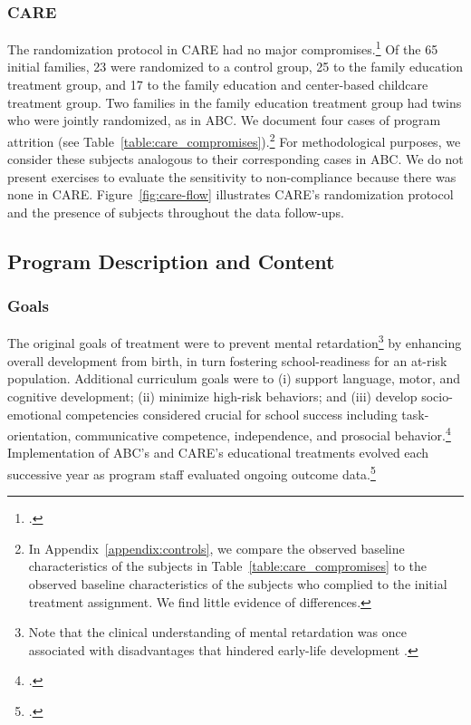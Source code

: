 \begin{appendices}
\subsubsection{CARE}

\noindent The randomization protocol in CARE had no major compromises.\footnote{\citet{Wasik_Ramey_etal_1990_CD,Burchinal_Campbell_etal_1997_CD}.} Of the 65 initial families, 23 were randomized to a control group, 25 to the family education treatment group, and 17 to the family education and center-based childcare treatment group. Two families in the family education treatment group had twins who were jointly randomized, as in ABC. We document four cases of program attrition (see Table~\ref{table:care_compromises}).\footnote{In Appendix~\ref{appendix:controls}, we compare the observed baseline characteristics of the subjects in Table~\ref{table:care_compromises} to the observed baseline characteristics of the subjects who complied to the initial treatment assignment. We find little evidence of differences.} For methodological purposes, we consider these subjects analogous to their corresponding cases in ABC. We do not present exercises to evaluate the sensitivity to non-compliance because there was none in CARE. Figure~\ref{fig:care-flow} illustrates CARE's randomization protocol and the presence of subjects throughout the data follow-ups.\\




\subsection{Program Description and Content}

\subsubsection{Goals}
\noindent The original goals of treatment were to prevent mental retardation\footnote{Note that the clinical understanding of mental retardation was once associated with disadvantages that hindered early-life development \citep{Mental-Retardation_America_2004_BOOK_NYU}.} by enhancing overall development from birth, in turn fostering school-readiness for an at-risk population. Additional curriculum goals were to (i) support language, motor, and cognitive development; (ii) minimize high-risk behaviors; and (iii) develop socio-emotional competencies considered crucial for school success including task-orientation, communicative competence, independence, and prosocial behavior.\footnote{\citet{Ramey_Collier_etal_1976_CarolinaAbecedarianProject, Ramey_etal_1985_Project-CARE_TiECSE, Sparling_1974_Synth_Edu_Infant_SPEECH, Wasik_Ramey_etal_1990_CD, Ramey-etal_2012-ABC}.} Implementation of ABC's and CARE's educational treatments evolved each successive year as program staff evaluated ongoing outcome data.\footnote{ \citet{Ramey-etal_1975_AJoMD, Finkelstein_1982_Day_Care_YC, McGinness_1982_Language-Poverty-Child,Haskins_1985_CD}.}\\



\end{appendices}
